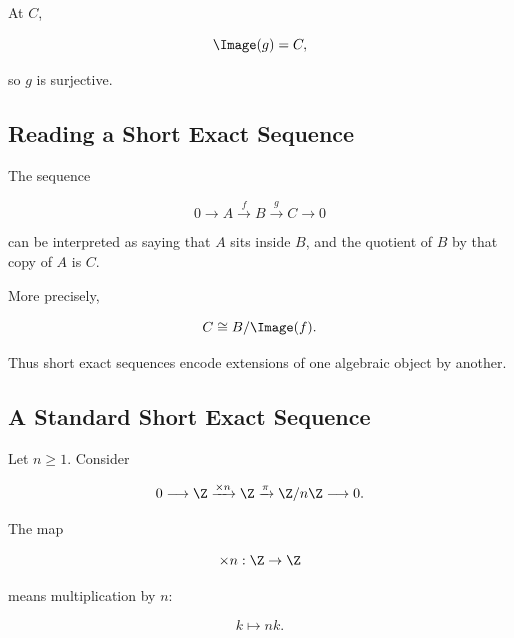 At \(C\),

\[ \Image(g)=C, \]

so \(g\) is surjective.

\subsection{Reading a Short Exact Sequence}
\label{subsec:reading-short-exact-sequence}

The sequence

\[ 0\longrightarrow A\xrightarrow{f}B\xrightarrow{g}C\longrightarrow0 \]

can be interpreted as saying that \(A\) sits inside \(B\), and the quotient
of \(B\) by that copy of \(A\) is \(C\).

More precisely,

\[ C\cong B/\Image(f). \]

Thus short exact sequences encode extensions of one algebraic object by
another.

\begin{center}
\end{center}

\subsection{A Standard Short Exact Sequence}
\label{subsec:standard-short-exact-sequence}

Let \(n\geq1\). Consider

\[ 0\longrightarrow\Z
\xrightarrow{\times n}\Z
\xrightarrow{\pi}\Z/n\Z
\longrightarrow0. \]

The map

\[ \times n:\Z\to\Z \]

means multiplication by \(n\):

\[ k\mapsto nk. \]

